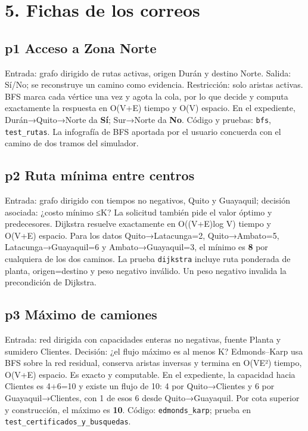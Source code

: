 \documentclass[12pt,a4paper]{article}
\begin{document}
\section{5. Fichas de los correos}

\subsection{p1 Acceso a Zona Norte}

Entrada: grafo dirigido de rutas activas, origen Durán y destino Norte. Salida: Sí/No; se reconstruye un camino como evidencia. Restricción: solo aristas activas. BFS marca cada vértice una vez y agota la cola, por lo que decide y computa exactamente la respuesta en O(V+E) tiempo y O(V) espacio. En el expediente, Durán→Quito→Norte da \textbf{Sí}; Sur→Norte da \textbf{No}. Código y pruebas: \texttt{bfs}, \texttt{test\_rutas}. La infografía de BFS aportada por el usuario concuerda con el camino de dos tramos del simulador.


\subsection{p2 Ruta mínima entre centros}

Entrada: grafo dirigido con tiempos no negativos, Quito y Guayaquil; decisión asociada: ¿costo mínimo ≤K? La solicitud también pide el valor óptimo y predecesores. Dijkstra resuelve exactamente en O((V+E)log V) tiempo y O(V+E) espacio. Para los datos Quito→Latacunga=2, Quito→Ambato=5, Latacunga→Guayaquil=6 y Ambato→Guayaquil=3, el mínimo es \textbf{8} por cualquiera de los dos caminos. La prueba \texttt{dijkstra} incluye ruta ponderada de planta, origen=destino y peso negativo inválido. Un peso negativo invalida la precondición de Dijkstra.


\subsection{p3 Máximo de camiones}

Entrada: red dirigida con capacidades enteras no negativas, fuente Planta y sumidero Clientes. Decisión: ¿el flujo máximo es al menos K? Edmonds–Karp usa BFS sobre la red residual, conserva aristas inversas y termina en O(VE²) tiempo, O(V+E) espacio. Es exacto y computable. En el expediente, la capacidad hacia Clientes es 4+6=10 y existe un flujo de 10: 4 por Quito→Clientes y 6 por Guayaquil→Clientes, con 1 de esos 6 desde Quito→Guayaquil. Por cota superior y construcción, el máximo es \textbf{10}. Código: \texttt{edmonds\_karp}; prueba en \texttt{test\_certificados\_y\_busquedas}.
\end{document}
